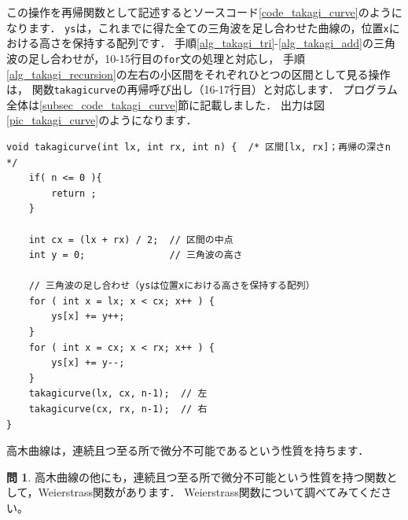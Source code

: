 \documentclass[dvipdfmx]{jsarticle}
\theoremstyle{definition}
\newtheorem{question}{問}[section]
\begin{document}
%
この操作を再帰関数として記述するとソースコード\ref{code_takagi_curve}のようになります．
\verb|ys|は，これまでに得た全ての三角波を足し合わせた曲線の，位置\verb|x|における高さを保持する配列です．
手順\ref{alg_takagi_tri}-\ref{alg_takagi_add}の三角波の足し合わせが，10-15行目の\verb|for|文の処理と対応し，
手順\ref{alg_takagi_recursion}の左右の小区間をそれぞれひとつの区間として見る操作は，
関数\verb|takagicurve|の再帰呼び出し（16-17行目）と対応します．
%
プログラム全体は\ref{subsec_code_takagi_curve}節に記載しました．
出力は図\ref{pic_takagi_curve}のようになります．
%
\begin{lstlisting}[caption=高木曲線を描く再帰関数, label=code_takagi_curve]
void takagicurve(int lx, int rx, int n) {  /* 区間[lx, rx]；再帰の深さn */
    if( n <= 0 ){
        return ;
    }

    int cx = (lx + rx) / 2;  // 区間の中点
    int y = 0;               // 三角波の高さ

    // 三角波の足し合わせ（ysは位置xにおける高さを保持する配列）
    for ( int x = lx; x < cx; x++ ) {
        ys[x] += y++;
    }
    for ( int x = cx; x < rx; x++ ) {
        ys[x] += y--;
    }
    takagicurve(lx, cx, n-1);  // 左
    takagicurve(cx, rx, n-1);  // 右
}
\end{lstlisting}

高木曲線は，連続且つ至る所で微分不可能であるという性質を持ちます．

\begin{question}
    高木曲線の他にも，連続且つ至る所で微分不可能という性質を持つ関数として，Weierstrass関数があります．
    Weierstrass関数について調べてみてください。
\end{question}

\end{document}
